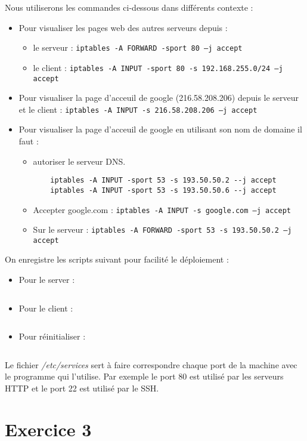 Nous utiliserons les commandes ci-dessous dans différents contexte :
\begin{itemize}
  \item Pour visualiser les pages web des autres serveurs depuis :
  \begin{itemize}
    \item le serveur : \texttt{iptables -A FORWARD -sport 80 --j accept}
    \item le client : \texttt{iptables -A INPUT -sport 80 -s 192.168.255.0/24 --j accept}
  \end{itemize}
  \item Pour visualiser la page d'acceuil de google (216.58.208.206) depuis le serveur et le client : \texttt{iptables -A INPUT -s 216.58.208.206 --j accept}
  \item Pour visualiser la page d'acceuil de google en utilisant son nom de domaine il faut :
  \begin{itemize}
    \item autoriser le serveur DNS.
    \begin{verbatim}
    iptables -A INPUT -sport 53 -s 193.50.50.2 --j accept
    iptables -A INPUT -sport 53 -s 193.50.50.6 --j accept
    \end{verbatim}
    \item Accepter google.com : \texttt{iptables -A INPUT -s google.com --j accept}
    \item Sur le serveur : \texttt{iptables -A FORWARD -sport 53 -s 193.50.50.2 --j accept}
  \end{itemize}
\end{itemize}

On enregistre les scripts suivant pour facilité le déploiement :
\begin{itemize}
  \item Pour le server :
  \inputminted{bash}{../sources/TP5/tp5-ex2-server.sh}
  \item Pour le client :
  \inputminted{bash}{../sources/TP5/tp5-ex2-client.sh}
  \item Pour réinitialiser :
  \inputminted{bash}{../sources/TP5/tp5-ex2-reset.sh}
\end{itemize}

Le fichier \textit{/etc/services} sert à faire correspondre chaque port de la machine avec le programme qui l'utilise. Par exemple le port 80 est utilisé par les serveurs HTTP et le port 22 est utilisé par le SSH.

\section{Exercice 3}


